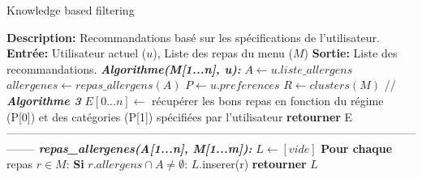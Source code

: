 \documentclass[11pt]{article}
\begin{document}
\begin{algorithm}
    \caption{Knowledge based filtering}
    \begin{algorithmic}[1]
        \Statex \textbf{Description:} Recommandations basé sur les spécifications de l'utilisateur.
        \Statex \textbf{Entrée:} Utilisateur actuel ($u$), Liste des repas du menu ($M$)
        \Statex \textbf{Sortie:} Liste des recommandations.
        \State \textbf{\textit{Algorithme(M[1...n], u):}}
        \State \hspace{0.5cm} $A \leftarrow u.liste\_allergens$
        \State \hspace{0.5cm} $allergenes \leftarrow repas\_allergens(A)$
        \State \hspace{0.5cm} $P \leftarrow u.preferences$
        \State \hspace{0.5cm} $R \leftarrow clusters(M)$ // \textbf{\textit{Algorithme 3}}
        \State \hspace{0.5cm} $E[0...n] \leftarrow$ récupérer les bons repas en fonction du régime (P[0]) et des
        \State \hspace{0.5cm} catégories (P[1]) spécifiées par l'utilisateur
        \State \hspace{0.5cm} \textbf{retourner} E
        \\
--------------------------------------------------------------------------------------------------------------------
        \State \textbf{\textit{repas\_allergenes(A[1...n], M[1...m]):}}
        \State \hspace{0.5cm} $L \leftarrow [vide]$
        \State \hspace{0.5cm} \textbf{Pour chaque} repas $r\in M$:
        \State \hspace{1cm} \textbf{Si} $r.allergens \cap A \neq \emptyset$:
        \State \hspace{1.5cm} $L$.inserer(r)
        \State \hspace{0.5cm} \textbf{retourner} $L$
    \end{algorithmic}
\end{algorithm}
\end{document}
